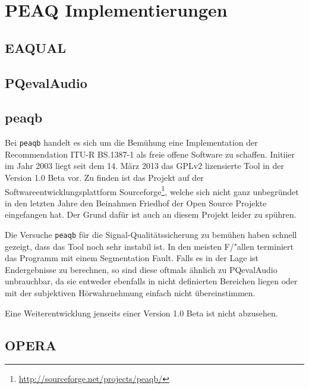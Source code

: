 \chapter{PEAQ Implementierungen}
\label{ch:peaq}

\section{EAQUAL}

\section{PQevalAudio}

\section{peaqb}

Bei \texttt{peaqb} handelt es sich um die Bemühung eine Implementation der Recommendation ITU-R BS.1387-1 als freie offene Software zu schaffen. Initiier im Jahr 2003 liegt seit dem 14. März 2013 das GPLv2 lizensierte Tool in der Version 1.0 Beta vor. Zu finden ist das Projekt auf der Softwareentwicklungsplattform Sourceforge\footnote{\url{http://sourceforge.net/projects/peaqb/}}, welche sich nicht ganz unbegr\"undet in den letzten Jahre den Beinahmen \glqq Friedhof der Open Source Projekte\grqq{} eingefangen hat. Der Grund daf\"ur ist auch an diesem Projekt leider zu sp\"uhren. 

Die Versuche \texttt{peaqb} für die Signal-Qualitätssicherung zu bem\"uhen haben schnell gezeigt, dass das Tool noch sehr instabil ist. In den meisten F/"allen terminiert das Programm mit einem Segmentation Fault. Falls es in der Lage ist Endergebnisse zu berechnen, so sind diese oftmals ähnlich zu PQevalAudio unbrauchbar, da sie entweder ebenfalls in nicht definierten Bereichen liegen oder mit der subjektiven H\"orwahrnehmung einfach nicht \"ubereinstimmen. 

Eine Weiterentwicklung jenseits einer Version 1.0 Beta ist nicht abzusehen. 

\section{OPERA}





